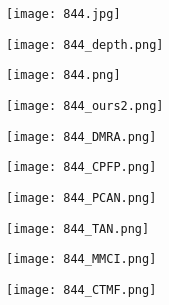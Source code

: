 \documentclass[runningheads]{llncs}
\begin{document}
\begin{figure}[t]
	\begin{subfigure}[t]{1.13cm}
		\centering
		\texttt{[image: 844.jpg]}
	\end{subfigure}
	\begin{subfigure}[t]{1.13cm}
		\centering
		\texttt{[image: 844\_depth.png]}
	\end{subfigure}
	\begin{subfigure}[t]{1.13cm}
		\centering
		\texttt{[image: 844.png]}
	\end{subfigure}
	\begin{subfigure}[t]{1.13cm}
		\centering
		\texttt{[image: 844\_ours2.png]}
	\end{subfigure}
	\begin{subfigure}[t]{1.13cm}
		\centering
		\texttt{[image: 844\_DMRA.png]}
	\end{subfigure}
	\begin{subfigure}[t]{1.13cm}
		\centering
		\texttt{[image: 844\_CPFP.png]}
	\end{subfigure}
	\begin{subfigure}[t]{1.13cm}
		\centering
		\texttt{[image: 844\_PCAN.png]}
	\end{subfigure}
	\begin{subfigure}[t]{1.13cm}
		\centering
		\texttt{[image: 844\_TAN.png]}
	\end{subfigure}
	\begin{subfigure}[t]{1.13cm}
		\centering
		\texttt{[image: 844\_MMCI.png]}
	\end{subfigure}
	\begin{subfigure}[t]{1.13cm}
		\centering
		\texttt{[image: 844\_CTMF.png]}
	\end{subfigure}
	
	\vspace{1pt}


\end{figure}
\end{document}
